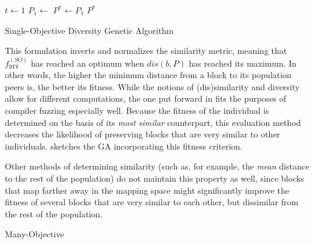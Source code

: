 \begin{algorithm}[t]

	\BlankLine
	\DontPrintSemicolon
	$t \leftarrow 1$\;
	$P_1 \leftarrow $ \;
	$P^{*} \leftarrow P_1$\;
	\Return $P^{*}$

	\caption{Single-Objective Diversity Genetic Algorithm}
	\label{alg:sodga}
\end{algorithm}


This formulation inverts and normalizes the similarity metric, meaning that
$f^{(SO)}_{\texttt{DIV}}$ has reached an optimum when $dis(b, P)$ has reached its maximum.
In other words, the higher the minimum distance from a block to its population peers is,
the better its fitness.
While the notions of (dis)similarity and diversity allow for different computations,
the one put forward in  fits the purposes of compiler fuzzing
especially well.
Because the fitness of the individual is determined on the basis of its \textit{most similar}
counterpart, this evaluation method decreases the likelihood of preserving blocks
that are very similar to other individuals.
 sketches the \gls{GA} incorporating this fitness criterion.

Other methods of determining similarity (such as, for example, the \textit{mean}
distance to the rest of the population) do not maintain this property as well,
since blocks that map farther away in the mapping space might significantly
improve the fitness of several blocks that are very similar to each other, but
dissimilar from the rest of the population.

  {Many-Objective}

